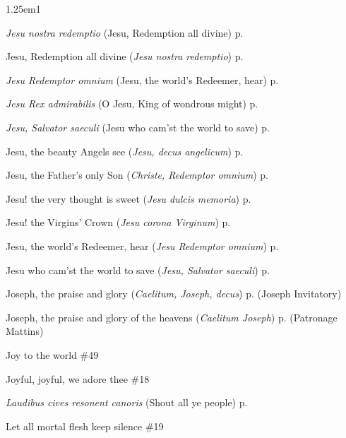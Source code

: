 \begin{hangparas}{1.25em}{1}
\par\noindent
\textit{Jesu nostra redemptio} (Jesu, Redemption all divine) \dotfill p. \pageref{AscensionMattinsHymn}
\par\noindent
Jesu, Redemption all divine (\textit{Jesu nostra redemptio}) \dotfill p. \pageref{AscensionMattinsHymn}
\par\noindent
\textit{Jesu Redemptor omnium} (Jesu, the world's Redeemer, hear) \dotfill p. \pageref{ConfessorBishopMattins}
\par\noindent
\textit{Jesu Rex admirabilis} (O Jesu, King of wondrous might) \dotfill p. \pageref{HolyNameInvitatoryHymn}
\par\noindent
\textit{Jesu, Salvator saeculi} (Jesu who cam'st the world to save) \dotfill p. \pageref{AllHallowsMattins}
\par\noindent
Jesu, the beauty Angels see (\textit{Jesu, decus angelicum}) \dotfill p. \pageref{HolyNameMattinsHymn}
\par\noindent
Jesu, the Father's only Son (\textit{Christe, Redemptor omnium}) \dotfill p. \pageref{ChristmasEvensong}
\par\noindent
Jesu! the very thought is sweet (\textit{Jesu dulcis memoria}) \dotfill p. \pageref{HolyNameEvensongHymn}
\par\noindent
Jesu! the Virgins' Crown (\textit{Jesu corona Virginum}) \dotfill p. \pageref{VirginMattins}
\par\noindent
Jesu, the world's Redeemer, hear (\textit{Jesu Redemptor omnium}) \dotfill p. \pageref{ConfessorBishopMattins}
\par\noindent
Jesu who cam'st the world to save (\textit{Jesu, Salvator saeculi}) \dotfill p. \pageref{AllHallowsMattins}
\par\noindent
Joseph, the praise and glory (\textit{Caelitum, Joseph, decus}) \dotfill p. \pageref{JosephInvitatory} (Joseph Invitatory)
\par\noindent
Joseph, the praise and glory of the heavens (\textit{Caelitum Joseph}) \dotfill p. \pageref{PatronageMattins} (Patronage Mattins)
\par\noindent
Joy to the world \dotfill \#49
\par\noindent
Joyful, joyful, we adore thee \dotfill \#18
\par\noindent
\textit{Laudibus cives resonent canoris} (Shout all ye people) \dotfill p. \pageref{BenedictEvensong}
\par\noindent
Let all mortal flesh keep silence \dotfill \#19
\par\noindent

\end{hangparas}
